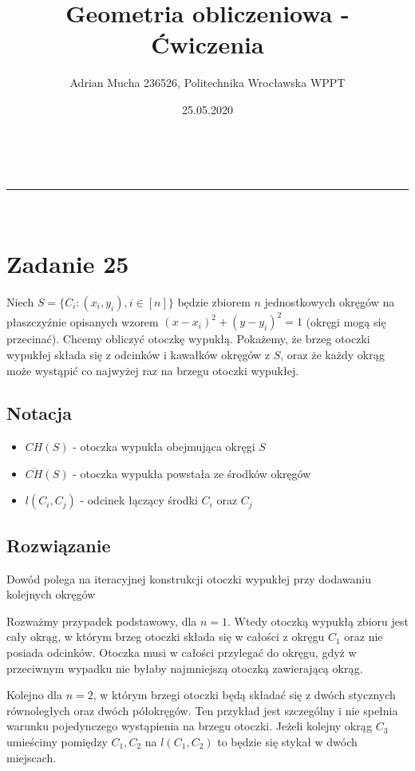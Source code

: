 \documentclass[a4paper,11pt]{article}
\makeatletter
\newcommand{\linia}{\rule{\linewidth}{0.5pt}}
\theoremstyle{mytheor}
\renewcommand{\maketitle}{
\begin{center}
\vspace{2ex}
{\huge \textsc{\@title}}
\vspace{1ex}
\\
\linia\\
\@author \hfill \@date
\vspace{4ex}
\end{center}
}
\makeatother
\begin{document}
\title{Geometria obliczeniowa - Ćwiczenia}

\author{Adrian Mucha 236526, Politechnika Wrocławska WPPT}

\date{25.05.2020}

\maketitle

\section*{Zadanie 25}
Niech $S = \{C_i: (x_i, y_i), i\in[n]\}$ będzie zbiorem $n$ jednostkowych okręgów na płaszczyźnie opisanych wzorem $(x - x_i)^2 + (y - y_i)^2 = 1$ (okręgi mogą się przecinać). Chcemy obliczyć otoczkę wypukłą. Pokażemy, że brzeg otoczki wypukłej składa się z odcinków i kawałków okręgów z $S$, oraz że każdy okrąg może wystąpić co najwyżej raz na brzegu otoczki wypukłej.

\subsection*{Notacja}
\begin{itemize}
    \item $CH(S)$ - otoczka wypukła obejmująca okręgi $S$
    \item $\overline{CH}(S)$ - otoczka wypukła powstała ze środków okręgów
    \item $l(C_i, C_j)$ - odcinek łączący środki $C_i$ oraz $C_j$
\end{itemize}

\subsection*{Rozwiązanie}
Dowód polega na iteracyjnej konstrukcji otoczki wypukłej przy dodawaniu kolejnych okręgów

Rozważmy przypadek podstawowy, dla $n = 1$. Wtedy otoczką wypukłą zbioru jest cały okrąg, w którym brzeg otoczki składa się w całości z okręgu $C_1$ oraz nie posiada odcinków. Otoczka musi w całości przylegać do okręgu, gdyż w przeciwnym wypadku nie byłaby najmniejszą otoczką zawierającą okrąg.

Kolejno dla $n = 2$, w którym brzegi otoczki będą składać się z dwóch stycznych równoległych oraz dwóch półokręgów. Ten przykład jest szczególny i nie spełnia warunku pojedynczego wystąpienia na brzegu otoczki. Jeżeli kolejny okrąg $C_3$ umieścimy pomiędzy $C_1, C_2$ na $l(C_1, C_2)$ to będzie się stykał w dwóch miejscach.
\end{document}
